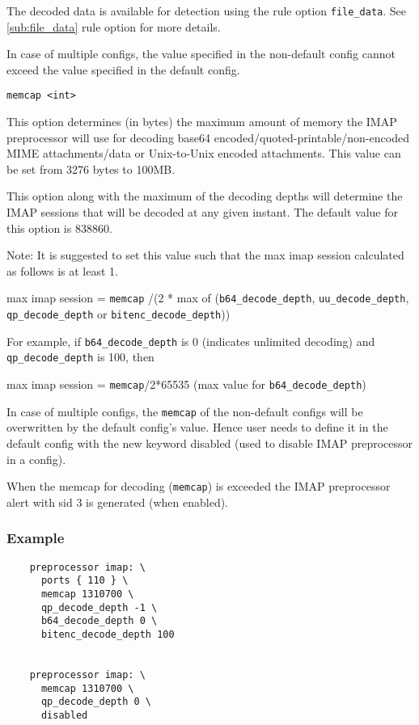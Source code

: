 \documentclass[english]{report}
\newcounter{slistnum}
\newenvironment{slist}
{ \begin{list}{ {\bf \arabic{slistnum}.} }{\usecounter{slistnum} } }
{ \end{list} }
\begin{document}
\begin{slist}
The decoded data is available for detection using the rule option \texttt{file\_data}.
See \ref{sub:file_data} rule option for more details.

In case of multiple configs, the value specified in the non-default config cannot exceed
the value specified in the default config.

\item \texttt{memcap <int>}

This option determines (in bytes) the maximum amount of memory the IMAP preprocessor
will use for decoding base64 encoded/quoted-printable/non-encoded MIME attachments/data
or Unix-to-Unix encoded attachments. This value can be set from 3276 bytes to 100MB.

This option along with the maximum of the decoding depths will determine the IMAP 
sessions that will be decoded at any given instant. The default value for this option
is 838860.

Note: It is suggested to set this value such that the max imap session calculated as
follows is at least 1.

max imap session = \texttt{memcap} /(2 * max of (\texttt{b64\_decode\_depth},
                                        \texttt{uu\_decode\_depth}, \texttt{qp\_decode\_depth}
                                        or \texttt{bitenc\_decode\_depth}))

For example, if \texttt{b64\_decode\_depth} is 0 (indicates unlimited decoding) and
\texttt{qp\_decode\_depth} is 100, then

max imap session = \texttt{memcap}/2*65535 (max value for \texttt{b64\_decode\_depth})

In case of multiple configs, the \texttt{memcap} of the non-default configs will be overwritten by the
default config's value. Hence user needs to define it in the default config with the new keyword
disabled (used to disable IMAP preprocessor in a config).

When the memcap for decoding (\texttt{memcap}) is exceeded the IMAP preprocessor alert with sid 3 is
generated (when enabled).

\end{slist}

\subsubsection{Example}

\begin{verbatim}
	preprocessor imap: \
	  ports { 110 } \
	  memcap 1310700 \
	  qp_decode_depth -1 \
	  b64_decode_depth 0 \
	  bitenc_decode_depth 100


	preprocessor imap: \
	  memcap 1310700 \
	  qp_decode_depth 0 \
	  disabled
\end{verbatim}
\end{document}
